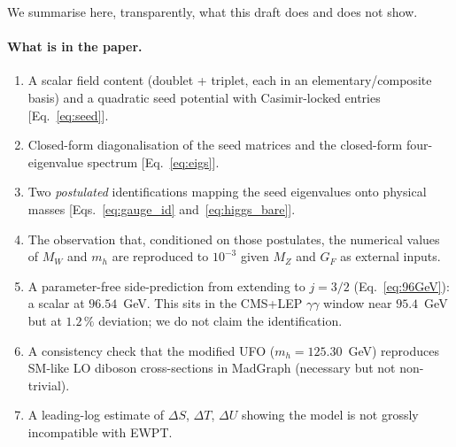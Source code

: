 \documentclass[11pt,a4paper]{article}
\begin{document}
We summarise here, transparently, what this draft does and does not show.

\paragraph{What is in the paper.}
\begin{enumerate}
\item A scalar field content (doublet + triplet, each in an
  elementary/composite basis) and a quadratic seed potential with
  Casimir-locked entries [Eq.~\eqref{eq:seed}].
\item Closed-form diagonalisation of the seed matrices and the
  closed-form four-eigenvalue spectrum [Eq.~\eqref{eq:eigs}].
\item Two \emph{postulated} identifications mapping the seed eigenvalues
  onto physical masses [Eqs.~\eqref{eq:gauge_id} and~\eqref{eq:higgs_bare}].
\item The observation that, conditioned on those postulates, the
  numerical values of $M_W$ and $m_h$ are reproduced to $10^{-3}$ given
  $M_Z$ and $G_F$ as external inputs.
\item A parameter-free side-prediction from extending to $j=3/2$
  (Eq.~\eqref{eq:96GeV}): a scalar at $96.54$~GeV. This sits in the
  CMS+LEP $\gamma\gamma$ window near $95.4$~GeV but at $1.2\,\%$
  deviation; we do not claim the identification.
\item A consistency check that the modified UFO ($m_h = 125.30$~GeV)
  reproduces SM-like LO diboson cross-sections in MadGraph
  (necessary but not non-trivial).
\item A leading-log estimate of $\Delta S$, $\Delta T$, $\Delta U$
  showing the model is not grossly incompatible with EWPT.
\end{enumerate}
\end{document}
